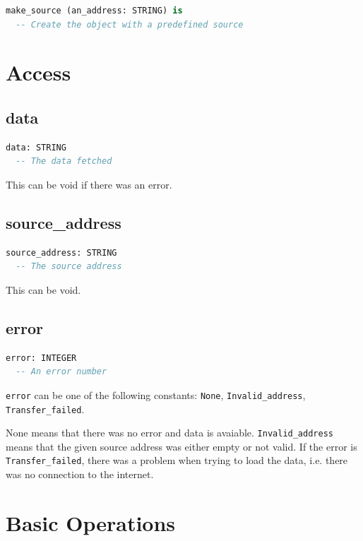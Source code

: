\documentclass[a4paper,fleqn]{report}
\begin{document}
\begin{lstlisting}[language=Eiffel]
make_source (an_address: STRING) is
  -- Create the object with a predefined source
\end{lstlisting}


\section{Access}
\label{sec:access}


\subsection{data}
\label{sec:data}

\begin{lstlisting}[language=Eiffel]
data: STRING
  -- The data fetched
\end{lstlisting}

This can be void if there was an error.


\subsection{source\_address}
\label{sec:source_address}

\begin{lstlisting}[language=Eiffel]
source_address: STRING
  -- The source address
\end{lstlisting}

This can be void.


\subsection{error}
\label{sec:error}

\begin{lstlisting}[language=Eiffel]
error: INTEGER
  -- An error number
\end{lstlisting}

\texttt{error} can be one of the following constants: \texttt{None},
\texttt{Invalid\_address}, \texttt{Transfer\_failed}.

None means that there was no error and data is avaiable.
\texttt{Invalid\_address} means that the given source address was
either empty or not valid. If the error is \texttt{Transfer\_failed},
there was a problem when trying to load the data, i.e. there was no
connection to the internet.


\section{Basic Operations}
\label{sec:basic-operations}
\end{document}
